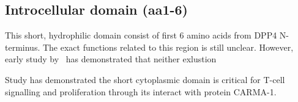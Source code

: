 \subsection{Introcellular domain (aa1-6)}

This short, hydrophilic domain consist of first 6 amino acids from DPP4 N-terminus. The exact functions related to this region is still unclear. However, early study by~\citet{Hong1990} has demonstrated that neither exlustion 

Study has demonstrated the short cytoplasmic domain is critical for T-cell signalling and proliferation through its interact with protein CARMA-1. \cite{Ohnuma_2007}